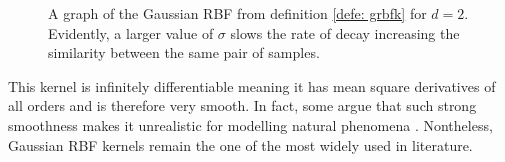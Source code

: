\begin{figure}[H]
    \centering
    \quad
    \caption{A graph of the Gaussian RBF from definition \ref{defe: grbfk} for $d=2$. Evidently, a larger value of $\sigma$ slows the rate of decay increasing the similarity between the same pair of samples.}%
    \label{fig: grbfk_graph_1}
\end{figure}

This kernel is infinitely differentiable meaning it has mean square derivatives of all orders and is therefore very smooth. In fact, some argue that such strong smoothness makes it unrealistic for modelling natural phenomena \cite{RasmussenCarlEdward2006Gpfm,SteinMichaelL1999IoSD}. Nontheless, Gaussian RBF kernels remain the one of the most widely used in literature.